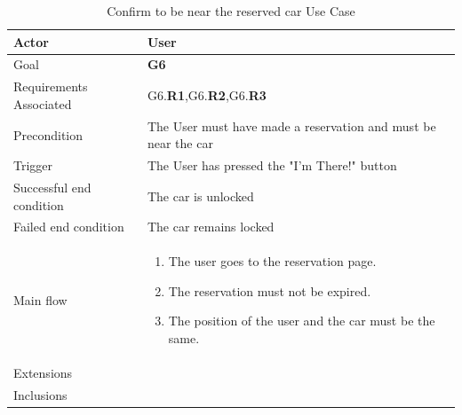 \newline
\begin{table}[htb]
\begin{center}
\renewcommand{\arraystretch}{1.5}
\begin{tabular}{|l|p{}|}
\hline
Actor & User \\ \hline
Goal & \textbf{G6} \\ \hline
Requirements Associated & G6.\textbf{R1},G6.\textbf{R2},G6.\textbf{R3} \\ \hline
Precondition & The User must have made a reservation and must be near the car \\ \hline
Trigger & The User has pressed the "I'm There!" button \\ \hline
Successful end condition & The car is unlocked \\ \hline
Failed end condition & The car remains locked \\ \hline
Main flow & \begin{minipage}[t]{0.6\textwidth}
\begin{enumerate}
\addtolength{\itemindent}{0.5cm}
\item The user goes to the reservation page.
\item The reservation must not be expired.
\item The position of the user and the car must be the same. 
\end{enumerate}
\end{minipage} \\ \hline
Extensions & \\ \hline
Inclusions & \\ \hline
\end{tabular}
\caption{ Confirm to be near the reserved car Use Case}
\end{center}
\end{table}
\clearpage


